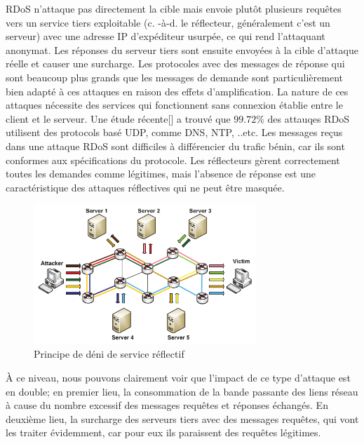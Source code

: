 RDoS n’attaque pas directement la cible mais envoie plutôt plusieurs requêtes vers un service tiers exploitable (c. -à-d. le réflecteur, généralement c'est un serveur) avec une adresse IP d’expéditeur usurpée, ce qui rend l'attaquant anonymat. Les réponses du serveur tiers sont ensuite envoyées à la cible d’attaque réelle et causer une surcharge. Les protocoles avec des messages de réponse qui sont beaucoup plus grands que les messages de demande sont particulièrement bien adapté à ces attaques en raison des effets d’amplification. La nature de ces attaques nécessite des services qui fonctionnent sans connexion établie entre le client et le serveur. Une étude récente[\cite{23}] a trouvé que $ 99.72\% $ des attauqes RDoS utilisent des protocols basé UDP, comme DNS, NTP, ..etc. Les messages reçus dans une attaque RDoS sont difficiles à différencier du trafic bénin, car ils sont conformes aux spécifications du protocole. Les réflecteurs gèrent correctement toutes les demandes comme légitimes, mais l’absence de réponse est une caractéristique des attaques réflectives qui ne peut être masquée.

\begin{figure}[h]
\centering
\includegraphics[width=0.75\textwidth]{Figures/rDoS}
\decoRule
\caption{Principe de déni de service réflectif}
\label{fig:rDoS}
\end{figure} 

À ce niveau, nous pouvons clairement voir que l'impact de ce type d'attaque est en double; en premier lieu, la consommation de la bande passante des liens réseau à cause du nombre excessif des messages requêtes et réponses échangés. En deuxième lieu, la surcharge des serveurs tiers avec des messages requêtes, qui vont les traiter évidemment, car pour eux ils paraissent des requêtes légitimes. 


